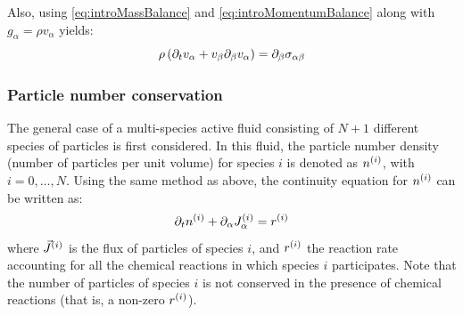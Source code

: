 Also, using \autoref{eq:introMassBalance} and \autoref{eq:introMomentumBalance} along with $g_\alpha = \rho v_\alpha$ yields:
\begin{equation}\label{eq:introMomentumBalanceVelocityForm}
    \rho\left(\inlinePartial{t}{v_\alpha} + v_\beta\inlinePartial{\beta}{v_\alpha}\right) = \inlinePartial{\beta}{\sigma_{\alpha\beta}}
\end{equation}

\subsubsection{Particle number conservation}\label{subsubsec:speciesBalance}
The general case of a multi-species active fluid consisting of $N+1$ different species of particles is first considered. In this fluid, the particle number density (number of particles per unit volume) for species $i$ is denoted as $n^{(i)}$, with $i = 0,\ldots,N$. Using the same method as above, the continuity equation for $n^{(i)}$ can be written as:
\begin{equation}\label{eq:introSpeciesBalance}
    \inlinePartial{t}{\speciesSuper{n}{i}} + \inlinePartial{\alpha}{\speciesSuper{J}{i}_\alpha} = \speciesSuper{r}{i}
\end{equation}
where $\vec{J}^{(i)}$ is the flux of particles of species $i$, and $r^{(i)}$ the reaction rate accounting for all the chemical reactions in which species $i$ participates. Note that the number of particles of species $i$ is not conserved in the presence of chemical reactions (that is, a non-zero $r^{(i)}$).

